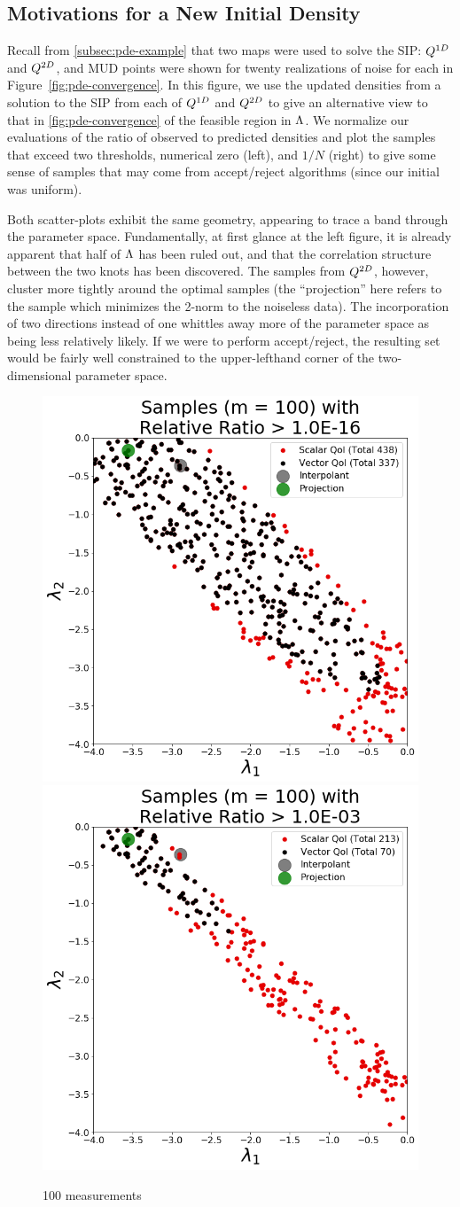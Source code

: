 \subsection{Motivations for a New Initial Density}
Recall from \ref{subsec:pde-example} that two maps were used to solve the SIP: $Q^{1D}$ and $Q^{2D}$, and MUD points were shown for twenty realizations of noise for each in Figure~\ref{fig:pde-convergence}.
In this figure, we use the updated densities from a solution to the SIP from each of $Q^{1D}$ and $Q^{2D}$ to give an alternative view to that in \ref{fig:pde-convergence} of the feasible region in ${\Lambda}$.
We normalize our evaluations of the ratio of observed to predicted densities and plot the samples that exceed two thresholds, numerical zero (left), and $1/N$ (right) to give some sense of samples that may come from accept/reject algorithms (since our initial was uniform).

Both scatter-plots exhibit the same geometry, appearing to trace a band through the parameter space.
Fundamentally, at first glance at the left figure, it is already apparent that half of ${\Lambda}$ has been ruled out, and that the correlation structure between the two knots has been discovered.
The samples from $Q^{2D}$, however, cluster more tightly around the optimal samples (the ``projection'' here refers to the sample which minimizes the 2-norm to the noiseless data).
The incorporation of two directions instead of one whittles away more of the parameter space as being less relatively likely.
If we were to perform accept/reject, the resulting set would be fairly well constrained to the upper-lefthand corner of the two-dimensional parameter space.

\begin{figure}[htbp]
\centering
  \includegraphics[width=0.45\linewidth]{figures/pde-highd/pde-highd_update_scatter_D2_t1-0E-16.png}
  \includegraphics[width=0.45\linewidth]{figures/pde-highd/pde-highd_update_scatter_D2_t1-0E-03.png}
\caption{
100 measurements
}
\label{fig:pde-highd-2d-scatter}
\end{figure}

